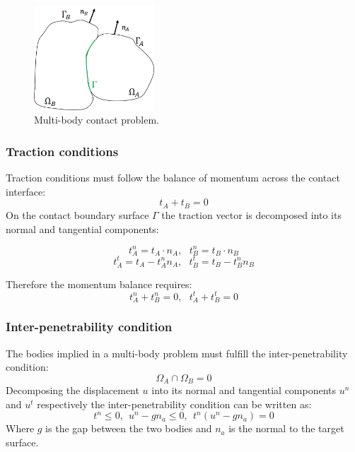  \begin{center}
\begin{figure}
\centerline{\includegraphics[width=0.4\textwidth,keepaspectratio]{figures/contact_bodies.jpg} }
\caption{Multi-body contact problem.}
\label{contact_bodies}
\end{figure}
\end{center} 
   
  \subsubsection*{Traction conditions}
  Traction conditions must follow the balance of momentum across the contact interface:
  \begin{equation}
  t_A + t_B=0
\end{equation}
On the contact boundary surface $\Gamma$ the traction vector is decomposed into its normal and tangential components:

$$t_A^n = t_A \cdot n_A,  \ \ \ t_B^n = t_B \cdot n_B$$
$$t_A^t = t_A - t_A^n n_A, \ \ \ t_B^t = t_B - t_B^n n_B$$

Therefore the momentum balance requires:
\begin{equation} 
t_A^n + t_B^n = 0, \ \ \ t_A^t + t_B^t = 0
\end{equation} 

 \subsubsection*{Inter-penetrability condition}
The bodies implied in a multi-body problem must fulfill the inter-penetrability condition:
\begin{equation}
\Omega_A \cap \Omega_B = 0
\end{equation}
Decomposing the displacement $u$ into its normal and tangential components $u^n$ and $u^t$ respectively the inter-penetrability condition can be written as:
\begin{equation}
t^n \leq 0, \ \ u^n-g n_a \leq 0, \ \ t^n(u^n-g n_a) = 0
\end{equation}
 Where $g$ is the gap between the two bodies and $n_a$ is the normal to the target surface.

